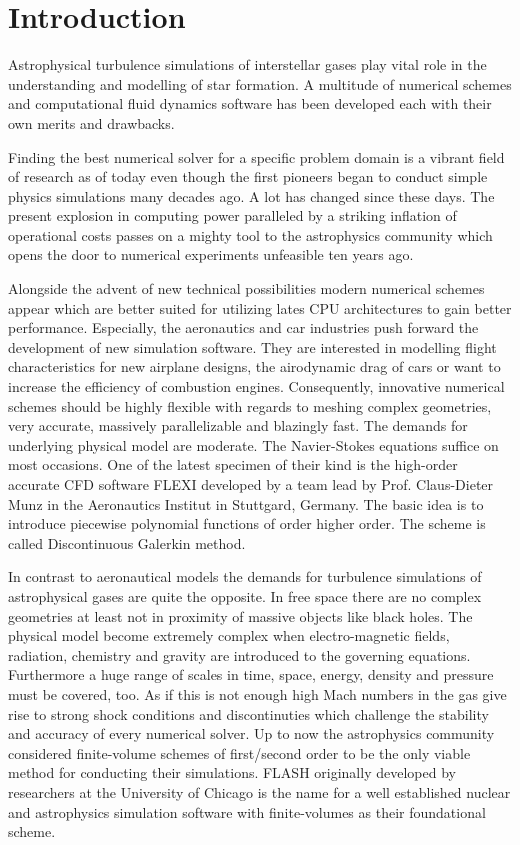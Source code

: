 \section{Introduction}

Astrophysical turbulence simulations of interstellar gases play vital role in
the understanding and modelling of star formation. \cite{mac2004turbulence}
A multitude of numerical
schemes and computational fluid dynamics software has been developed each
with their own merits and drawbacks.

Finding the best numerical solver for a specific problem domain is a vibrant
field of research as of today even though the first pioneers began to conduct
simple physics simulations many decades ago. A lot has changed since these
days. The present explosion in computing power paralleled by a striking
inflation of operational costs passes on a mighty tool to the astrophysics
community which opens the door to numerical experiments unfeasible ten years
ago.

Alongside the advent of new technical possibilities modern numerical schemes
appear which are better suited for utilizing lates CPU architectures to gain
better performance. Especially, the aeronautics and car industries push forward
the development of new simulation software. They are interested in modelling
flight characteristics for new airplane designs, the airodynamic drag of cars
or want to increase the efficiency of combustion engines. Consequently,
innovative numerical schemes should be highly flexible with regards to meshing
complex geometries, very accurate, massively parallelizable and blazingly fast.
The demands for underlying physical model are moderate. The Navier-Stokes
equations suffice on most occasions. One of the latest specimen of their kind
is the high-order accurate CFD software FLEXI developed by a team lead by
Prof. Claus-Dieter Munz in the Aeronautics Institut in Stuttgard, Germany.
The basic idea is to introduce piecewise polynomial functions of order higher
order. The scheme is called Discontinuous Galerkin method.

In contrast to aeronautical models the demands for turbulence simulations of
astrophysical gases are quite the opposite. In free space there are no complex
geometries at least not in proximity of massive objects like black holes. The
physical model become extremely complex when electro-magnetic fields,
radiation, chemistry and gravity are introduced to the governing equations.
Furthermore a huge range of scales in time, space, energy, density and pressure
must be covered, too. As if this is not enough high Mach numbers in the gas
give rise to strong shock conditions and discontinuties which challenge the
stability and accuracy of every numerical solver. Up to now the astrophysics
community considered finite-volume schemes of first/second order to be the only
viable method for conducting their simulations. FLASH originally developed by
researchers at the University of Chicago is the name for a well established
nuclear and astrophysics simulation software with finite-volumes as their
foundational scheme.


